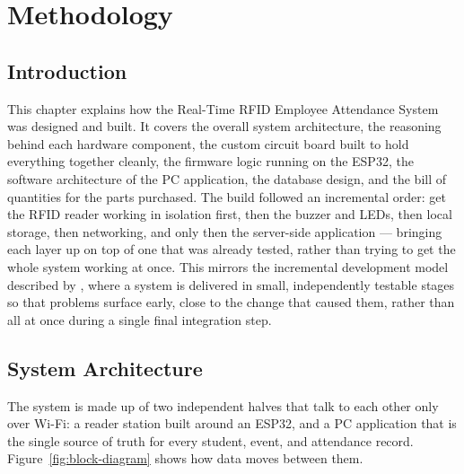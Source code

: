 \chapter{Methodology}
\label{ch:methodology}

\section{Introduction}

This chapter explains how the Real-Time RFID Employee Attendance System was designed and built. It covers the overall system architecture, the reasoning behind each hardware component, the custom circuit board built to hold everything together cleanly, the firmware logic running on the ESP32, the software architecture of the PC application, the database design, and the bill of quantities for the parts purchased. The build followed an incremental order: get the RFID reader working in isolation first, then the buzzer and LEDs, then local storage, then networking, and only then the server-side application — bringing each layer up on top of one that was already tested, rather than trying to get the whole system working at once. This mirrors the incremental development model described by \textcite{sommerville2016software}, where a system is delivered in small, independently testable stages so that problems surface early, close to the change that caused them, rather than all at once during a single final integration step.

\section{System Architecture}

The system is made up of two independent halves that talk to each other only over Wi-Fi: a reader station built around an ESP32, and a PC application that is the single source of truth for every student, event, and attendance record. Figure~\ref{fig:block-diagram} shows how data moves between them.

